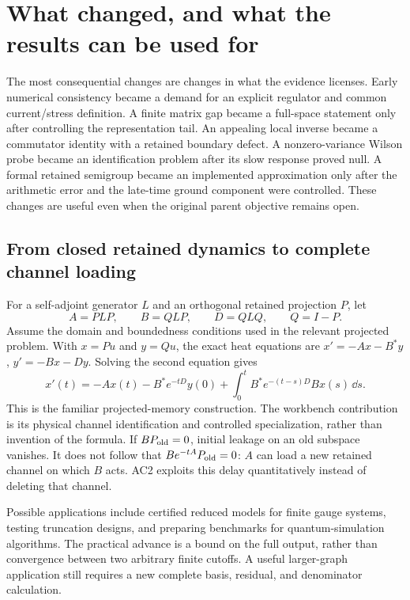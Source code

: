 \section{What changed, and what the results can be used for}
\label{sec:synthesis}

The most consequential changes are changes in what the evidence licenses. Early numerical consistency became a demand for an explicit regulator and common current/stress definition. A finite matrix gap became a full-space statement only after controlling the representation tail. An appealing local inverse became a commutator identity with a retained boundary defect. A nonzero-variance Wilson probe became an identification problem after its slow response proved null. A formal retained semigroup became an implemented approximation only after the arithmetic error and the late-time ground component were controlled. These changes are useful even when the original parent objective remains open.

\subsection{From closed retained dynamics to complete channel loading}
For a self-adjoint generator $L$ and an orthogonal retained projection $P$, let
\begin{equation}
 A=PLP,\qquad B=QLP,\qquad D=QLQ,\qquad Q=I-P.
\end{equation}
Assume the domain and boundedness conditions used in the relevant projected problem. With $x=Pu$ and $y=Qu$, the exact heat equations are $x'=-Ax-B^*y$, $y'=-Bx-Dy$. Solving the second equation gives
\begin{equation}
 x'(t)=-Ax(t)-B^*e^{-tD}y(0)
       +\int_0^t B^*e^{-(t-s)D}Bx(s)\,\dd s.
\label{eq:memory-synthesis}
\end{equation}
This is the familiar projected-memory construction. The workbench contribution is its physical channel identification and controlled specialization, rather than invention of the formula. If $BP_{\rm old}=0$, initial leakage on an old subspace vanishes. It does not follow that $Be^{-tA}P_{\rm old}=0$: $A$ can load a new retained channel on which $B$ acts. AC2 exploits this delay quantitatively instead of deleting that channel.

Possible applications include certified reduced models for finite gauge systems, testing truncation designs, and preparing benchmarks for quantum-simulation algorithms. The practical advance is a bound on the full output, rather than convergence between two arbitrary finite cutoffs. A useful larger-graph application still requires a new complete basis, residual, and denominator calculation.

